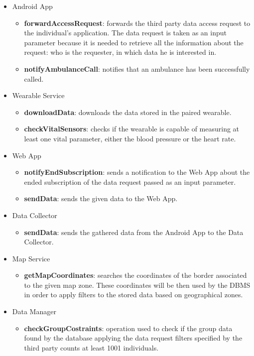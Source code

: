 \begin{itemize}
\item Android App
\begin{itemize}
\item \textbf{forwardAccessRequest}: forwards the third party data access request to the individual's application. The data request is taken as an input parameter because it is needed to retrieve all the information about the request: who is the requester, in which data he is interested in.
\item \textbf{notifyAmbulanceCall}: notifies that an ambulance has been successfully called.
\end{itemize}
\item Wearable Service
\begin{itemize}
\item \textbf{downloadData}: downloads the data stored in the paired wearable.
\item \textbf{checkVitalSensors}: checks if the wearable is capable of measuring at least one vital parameter, either the blood pressure or the heart rate.
\end{itemize}
\item Web App
\begin{itemize}
\item \textbf{notifyEndSubscription}: sends a notification to the Web App about the ended subscription of the data request passed as an input parameter.
\item \textbf{sendData}: sends the given data to the Web App.
\end{itemize}
\item Data Collector
\begin{itemize}
\item \textbf{sendData}: sends the gathered data from the Android App to the Data Collector.
\end{itemize}
\item Map Service
\begin{itemize}
\item \textbf{getMapCoordinates}: searches the coordinates of the border associated to the given map zone. These coordinates will be then used by the DBMS in order to apply filters to the stored data based on geographical zones.
\end{itemize}
\item Data Manager
\begin{itemize}
\item \textbf{checkGroupCostraints}: operation used to check if the group data found by the database applying the data request filters specified by the third party counts at least 1001 individuals.

\end{itemize}
\end{itemize}
